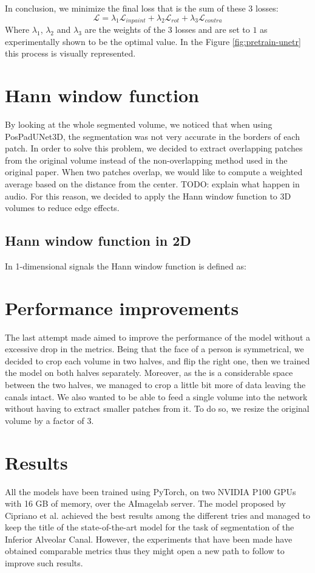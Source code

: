 In conclusion, we minimize the final loss that is the sum of these 3 losses:
$$
\mathcal{L} = \lambda_1\mathcal{L}_{inpaint} + \lambda_2\mathcal{L}_{rot} +
\lambda_3\mathcal{L}_{contra}
$$
Where $\lambda_1$, $\lambda_2$ and $\lambda_3$ are the weights of the 3 losses
and are set to $1$ as experimentally shown to be the optimal value. In the
Figure \ref{fig:pretrain-unetr} this process is visually represented.

\section{Hann window function}
By looking at the whole segmented volume, we noticed that when using
PosPadUNet3D, the segmentation was not very accurate in the borders of each
patch. In order to solve this problem, we decided to extract overlapping patches
from the original volume instead of the non-overlapping method used in the
original paper. When two patches overlap, we would like to compute a weighted
average based on the distance from the center.
TODO: explain what happen in audio.
For this reason, we decided to apply the Hann window function to 3D volumes to reduce edge effects.
\subsection{Hann window function in 2D}
In 1-dimensional signals the Hann window function is defined as:

\section{Performance improvements}
The last attempt made aimed to improve the performance of the model without a
excessive drop in the metrics. Being that the face of a person is symmetrical,
we decided to crop each volume in two halves, and flip the right one, then we
trained the model on both halves separately. Moreover, as the is a considerable
space between the two halves, we managed to crop a little bit more of data
leaving the canals intact. We also wanted to be able to feed a single volume
into the network without having to extract smaller patches from it. To do so, we
resize the original volume by a factor of $3$.

\section{Results}
All the models have been trained using PyTorch, on two NVIDIA P100 GPUs with 16
GB of memory, over the AImagelab server.
The model proposed by Cipriano et al. achieved the best results among the
different tries and managed to keep the title of the state-of-the-art model for
the task of segmentation of the Inferior Alveolar Canal. However, the
experiments that have been made have obtained comparable metrics thus they might
open a new path to follow to improve such results.

